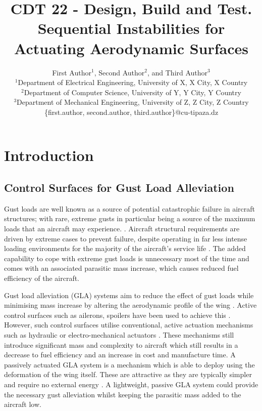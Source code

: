 \documentclass{IEEEtran}
\title{CDT 22 - Design, Build and Test. Sequential Instabilities for Actuating Aerodynamic Surfaces}
\author{First Author$^1$, Second Author$^2$, and Third Author$^3$\\
	$^1$Department of Electrical Engineering, University of X, X City, X Country\\
	$^2$Department of Computer Science, University of Y, Y City, Y Country\\
	$^3$Department of Mechanical Engineering, University of Z, Z City, Z Country\\
	\{first.author, second.author, third.author\}@cu-tipaza.dz}
\begin{document}
	\maketitle
	
	\begin{abstract}
		
	\end{abstract}
	
	\section{Introduction}
		\subsection{Control Surfaces for Gust Load Alleviation}
		Gust loads are well known as a source of potential catastrophic failure in aircraft structures; with rare, extreme gusts in particular being a source of the maximum loads that an aircraft may experience. \cite{Wu2019,Guo_2015}. Aircraft structural requirements are driven by extreme cases to prevent failure, despite operating in far less intense loading environments for the majority of the aircraft's service life \cite{Li2021}. The added capability to cope with extreme gust loads is unnecessary most of the time and comes with an associated parasitic mass increase, which causes reduced fuel efficiency of the aircraft. 
		
		Gust load alleviation (GLA) systems aim to reduce the effect of gust loads while minimising mass increase by altering the aerodynamic profile of the wing \cite{Li_2022}. Active control surfaces such as ailerons, spoilers have been used to achieve this \cite{Li_2022}. However, such control surfaces utilise conventional, active actuation mechanisms such as hydraulic or electro-mechanical actuators \cite{QI_2011}. These mechanisms still introduce significant mass and complexity to aircraft which still results in a decrease to fuel efficiency and an increase in cost and manufacture time. A passively actuated GLA system is a mechanism which is able to deploy using the deformation of the wing itself. These are attractive as they are typically simpler and require no external energy \cite{Li_2022}. A lightweight, passive GLA system could provide the necessary gust alleviation whilst keeping the parasitic mass added to the aircraft low.  
		
\end{document}
